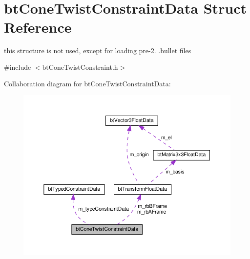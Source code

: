 \hypertarget{structbtConeTwistConstraintData}{}\section{bt\+Cone\+Twist\+Constraint\+Data Struct Reference}
\label{structbtConeTwistConstraintData}


this structure is not used, except for loading pre-\/2. .bullet files  




{\ttfamily \#include $<$bt\+Cone\+Twist\+Constraint.\+h$>$}



Collaboration diagram for bt\+Cone\+Twist\+Constraint\+Data\+:
\nopagebreak
\begin{figure}[H]
\begin{center}
\leavevmode
\includegraphics[width=350pt]{structbtConeTwistConstraintData__coll__graph}
\end{center}
\end{figure}
